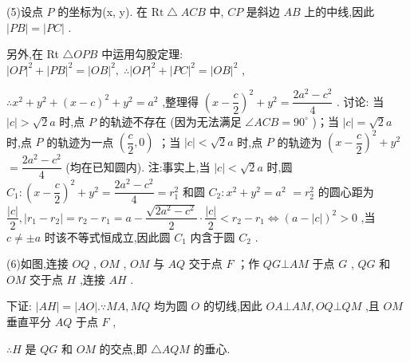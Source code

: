 (5)设点 $P$ 的坐标为(x, y). 在 $\mathrm{{Rt}} \bigtriangleup  {ACB}$ 中, ${CP}$ 是斜边 ${AB}$ 上的中线,因此 $\left| {PB}\right|  = \left| {PC}\right|$ .

另外,在 Rt $\bigtriangleup {OPB}$ 中运用勾股定理: ${\left| OP\right| }^{2} + {\left| PB\right| }^{2} = {\left| OB\right| }^{2},\;\therefore {\left| OP\right| }^{2} + {\left| PC\right| }^{2} = {\left| OB\right| }^{2}$ ,

$\therefore {x}^{2} + {y}^{2} + {\left( x - c\right) }^{2} + {y}^{2} = {a}^{2}$ ,整理得 ${\left( x - \dfrac{c}{2}\right) }^{2} + {y}^{2} = \dfrac{2{a}^{2} - {c}^{2}}{4}$ . 讨论: 当 $\left| c\right|  > \sqrt{2}a$ 时,点 $P$ 的轨迹不存在 (因为无法满足 $\angle {ACB} = {90}^{ \circ  }$ )；当 $\left| c\right|  = \sqrt{2}a$ 时,点 $P$ 的轨迹为一点 $\left( {\dfrac{c}{2},0}\right)$ ；当 $\left| c\right|  < \sqrt{2}a$ 时,点 $P$ 的轨迹为 ${\left( x - \dfrac{c}{2}\right) }^{2} + {y}^{2}$  $= \dfrac{2{a}^{2} - {c}^{2}}{4}$ (均在已知圆内). 注:事实上,当 $\left| c\right|  < \sqrt{2}a$ 时,圆 ${C}_{1} : {\left( x - \dfrac{c}{2}\right) }^{2} + {y}^{2} = \dfrac{2{a}^{2} - {c}^{2}}{4} = {r}_{1}^{2}$ 和圆 ${C}_{2} : {x}^{2} + {y}^{2} = {a}^{2}$  $= {r}_{2}^{2}$ 的圆心距为 $\dfrac{\left| c\right| }{2},\left| {{r}_{1} - {r}_{2}}\right|  = {r}_{2} - {r}_{1} = a - \dfrac{\sqrt{2{a}^{2} - {c}^{2}}}{2} \cdot  \dfrac{\left| c\right| }{2} < {r}_{2} - {r}_{1} \Leftrightarrow  {\left( a - \left| c\right| \right) }^{2} > 0$ ,当 $c \neq   \pm  a$ 时该不等式恒成立,因此圆 ${C}_{1}$ 内含于圆 ${C}_{2}$ .

(6)如图,连接 ${OQ}$ , ${OM}$ , ${OM}$ 与 ${AQ}$ 交于点 $F$ ；作 ${QG} \bot  {AM}$ 于点 $G$ , ${QG}$ 和 ${OM}$ 交于点 $H$ ,连接 ${AH}$ .

下证: $\left| {AH}\right|  = \left| {AO}\right| .\because {MA},{MQ}$ 均为圆 $O$ 的切线,因此 ${OA}\bot {AM},{OQ}\bot {QM}$ ,且 ${OM}$ 垂直平分 ${AQ}$ 于点 $F$ ,

$\therefore H$ 是 ${QG}$ 和 ${OM}$ 的交点,即 $\bigtriangleup {AQM}$ 的垂心.


